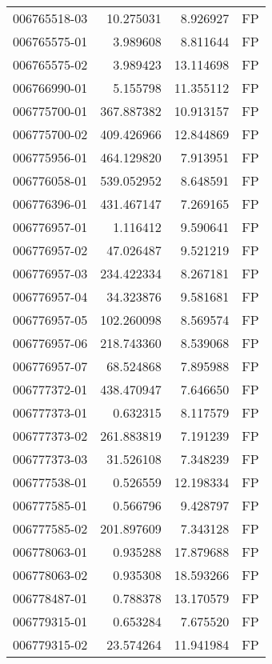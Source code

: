\begin{tabular}{lrrl}
006765518-03 &   10.275031 &       8.926927 &   FP \\
006765575-01 &    3.989608 &       8.811644 &   FP \\
006765575-02 &    3.989423 &      13.114698 &   FP \\
006766990-01 &    5.155798 &      11.355112 &   FP \\
006775700-01 &  367.887382 &      10.913157 &   FP \\
006775700-02 &  409.426966 &      12.844869 &   FP \\
006775956-01 &  464.129820 &       7.913951 &   FP \\
006776058-01 &  539.052952 &       8.648591 &   FP \\
006776396-01 &  431.467147 &       7.269165 &   FP \\
006776957-01 &    1.116412 &       9.590641 &   FP \\
006776957-02 &   47.026487 &       9.521219 &   FP \\
006776957-03 &  234.422334 &       8.267181 &   FP \\
006776957-04 &   34.323876 &       9.581681 &   FP \\
006776957-05 &  102.260098 &       8.569574 &   FP \\
006776957-06 &  218.743360 &       8.539068 &   FP \\
006776957-07 &   68.524868 &       7.895988 &   FP \\
006777372-01 &  438.470947 &       7.646650 &   FP \\
006777373-01 &    0.632315 &       8.117579 &   FP \\
006777373-02 &  261.883819 &       7.191239 &   FP \\
006777373-03 &   31.526108 &       7.348239 &   FP \\
006777538-01 &    0.526559 &      12.198334 &   FP \\
006777585-01 &    0.566796 &       9.428797 &   FP \\
006777585-02 &  201.897609 &       7.343128 &   FP \\
006778063-01 &    0.935288 &      17.879688 &   FP \\
006778063-02 &    0.935308 &      18.593266 &   FP \\
006778487-01 &    0.788378 &      13.170579 &   FP \\
006779315-01 &    0.653284 &       7.675520 &   FP \\
006779315-02 &   23.574264 &      11.941984 &   FP \\

\end{tabular}
